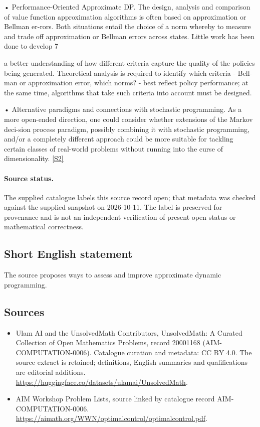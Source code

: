 \documentclass[11pt]{article}
\newcommand{\sref}[2]{\hyperlink{source:#1:#2}{[S#2]}}
\begin{document}
• Performance-Oriented Approximate DP. The design, analysis and comparison of value function approximation algorithms is often based on approximation or Bellman er-rors. Both situations entail the choice of a norm whereby to measure and trade off approximation or Bellman errors across states. Little work has been done to develop 7

a better understanding of how different criteria capture the quality of the policies being generated. Theoretical analysis is required to identify which criteria - Bell-man or approximation error, which norms? - best reflect policy performance; at the same time, algorithms that take such criteria into account must be designed.

• Alternative paradigms and connections with stochastic programming. As a more open-ended direction, one could consider whether extensions of the Markov deci-sion process paradigm, possibly combining it with stochastic programming, and/or a completely different approach could be more suitable for tackling certain classes of real-world problems without running into the curse of dimensionality. \sref{20001168}{2}
\paragraph{Source status.}
The supplied catalogue labels this source record open; that metadata was checked against the supplied snapshot on 2026-10-11. The label is preserved for provenance and is not an independent verification of present open status or mathematical correctness.
\subsection{Short English statement}
The source proposes ways to assess and improve approximate dynamic programming.
\subsection{Sources}
\begin{itemize}
\item[\hypertarget{source:20001168:1}{S1}] Ulam AI and the UnsolvedMath Contributors, UnsolvedMath: A Curated Collection of Open Mathematics Problems, record 20001168 (AIM-COMPUTATION-0006). Catalogue curation and metadata: CC BY 4.0. The source extract is retained; definitions, English summaries and qualifications are editorial additions.
\url{https://huggingface.co/datasets/ulamai/UnsolvedMath}.
\item[\hypertarget{source:20001168:2}{S2}] AIM Workshop Problem Lists, source linked by catalogue record AIM-COMPUTATION-0006.
\url{https://aimath.org/WWN/optimalcontrol/optimalcontrol.pdf}.
\end{itemize}
\end{document}
